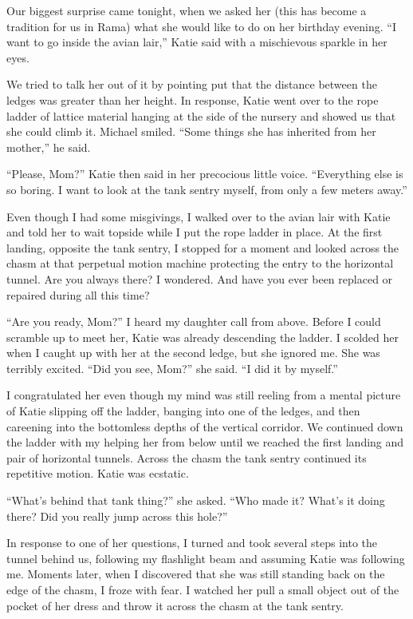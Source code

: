 \documentclass[]{article}
\begin{document}
Our biggest surprise came tonight, when we asked her (this has become a tradition for us in Rama) what she would like to do on her birthday evening. “I want to go inside the avian lair,” Katie said with a mischievous sparkle in her eyes.

We tried to talk her out of it by pointing put that the distance between the ledges was greater than her height. In response, Katie went over to the rope ladder of lattice material hanging at the side of the nursery and showed us that she could climb it. Michael smiled. “Some things she has inherited from her mother,” he said.

“Please, Mom?” Katie then said in her precocious little voice. “Everything else is so boring. I want to look at the tank sentry myself, from only a few meters away.”

Even though I had some misgivings, I walked over to the avian lair with Katie and told her to wait topside while I put the rope ladder in place. At the first landing, opposite the tank sentry, I stopped for a moment and looked across the chasm at that perpetual motion machine protecting the entry to the horizontal tunnel. Are you always there? I wondered. And have you ever been replaced or repaired during all this time?

“Are you ready, Mom?” I heard my daughter call from above. Before I could scramble up to meet her, Katie was already descending the ladder. I scolded her when I caught up with her at the second ledge, but she ignored me. She was terribly excited. “Did you see, Mom?” she said. “I did it by myself.”

I congratulated her even though my mind was still reeling from a mental picture of Katie slipping off the ladder, banging into one of the ledges, and then careening into the bottomless depths of the vertical corridor. We continued down the ladder with my helping her from below until we reached the first landing and pair of horizontal tunnels. Across the chasm the tank sentry continued its repetitive motion. Katie was ecstatic.

“What’s behind that tank thing?” she asked. “Who made it? What’s it doing there? Did you really jump across this hole?”

In response to one of her questions, I turned and took several steps into the tunnel behind us, following my flashlight beam and assuming Katie was following me. Moments later, when I discovered that she was still standing back on the edge of the chasm, I froze with fear. I watched her pull a small object out of the pocket of her dress and throw it across the chasm at the tank sentry.
\end{document}
